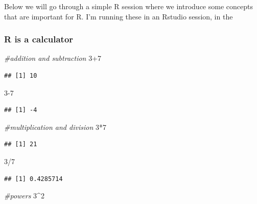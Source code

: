 \documentclass[
]{article}
\newenvironment{Shaded}{\begin{snugshade}}{\end{snugshade}}
\newcommand{\CommentTok}[1]{\textcolor[rgb]{0.56,0.35,0.01}{\textit{#1}}}
\newcommand{\DecValTok}[1]{\textcolor[rgb]{0.00,0.00,0.81}{#1}}
\newcommand{\SpecialCharTok}[1]{\textcolor[rgb]{0.00,0.00,0.00}{#1}}
\begin{document}
Below we will go through a simple R session where we introduce some
concepts that are important for R. I'm running these in an Rstudio
session, in the

\hypertarget{r-is-a-calculator}{%
\subsubsection{R is a calculator}\label{r-is-a-calculator}}

\begin{Shaded}
\begin{Highlighting}[]
\CommentTok{\#addition and subtraction}
\DecValTok{3}\SpecialCharTok{+}\DecValTok{7}
\end{Highlighting}
\end{Shaded}

\begin{verbatim}
## [1] 10
\end{verbatim}

\begin{Shaded}
\begin{Highlighting}[]
\DecValTok{3{-}7}
\end{Highlighting}
\end{Shaded}

\begin{verbatim}
## [1] -4
\end{verbatim}

\begin{Shaded}
\begin{Highlighting}[]
\CommentTok{\#multiplication and division}
\DecValTok{3}\SpecialCharTok{*}\DecValTok{7}
\end{Highlighting}
\end{Shaded}

\begin{verbatim}
## [1] 21
\end{verbatim}

\begin{Shaded}
\begin{Highlighting}[]
\DecValTok{3}\SpecialCharTok{/}\DecValTok{7}
\end{Highlighting}
\end{Shaded}

\begin{verbatim}
## [1] 0.4285714
\end{verbatim}

\begin{Shaded}
\begin{Highlighting}[]
\CommentTok{\#powers}
\DecValTok{3}\SpecialCharTok{\^{}}\DecValTok{2}
\end{Highlighting}
\end{Shaded}
\end{document}
